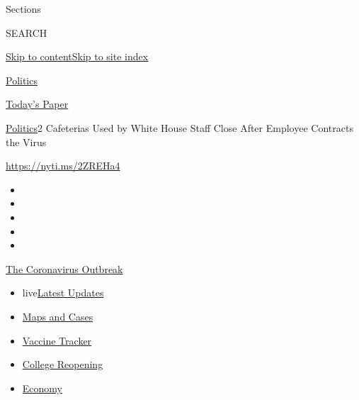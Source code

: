 Sections

SEARCH

\protect\hyperlink{site-content}{Skip to
content}\protect\hyperlink{site-index}{Skip to site index}

\href{https://www.nytimes3xbfgragh.onion/section/politics}{Politics}

\href{https://myaccount.nytimes3xbfgragh.onion/auth/login?response_type=cookie\&client_id=vi}{}

\href{https://www.nytimes3xbfgragh.onion/section/todayspaper}{Today's
Paper}

\href{/section/politics}{Politics}\textbar{}2 Cafeterias Used by White
House Staff Close After Employee Contracts the Virus

\url{https://nyti.ms/2ZREHa4}

\begin{itemize}
\item
\item
\item
\item
\item
\end{itemize}

\href{https://www.nytimes3xbfgragh.onion/news-event/coronavirus?action=click\&pgtype=Article\&state=default\&region=TOP_BANNER\&context=storylines_menu}{The
Coronavirus Outbreak}

\begin{itemize}
\tightlist
\item
  live\href{https://www.nytimes3xbfgragh.onion/2020/08/03/world/coronavirus-covid-19.html?action=click\&pgtype=Article\&state=default\&region=TOP_BANNER\&context=storylines_menu}{Latest
  Updates}
\item
  \href{https://www.nytimes3xbfgragh.onion/interactive/2020/us/coronavirus-us-cases.html?action=click\&pgtype=Article\&state=default\&region=TOP_BANNER\&context=storylines_menu}{Maps
  and Cases}
\item
  \href{https://www.nytimes3xbfgragh.onion/interactive/2020/science/coronavirus-vaccine-tracker.html?action=click\&pgtype=Article\&state=default\&region=TOP_BANNER\&context=storylines_menu}{Vaccine
  Tracker}
\item
  \href{https://www.nytimes3xbfgragh.onion/2020/08/02/us/covid-college-reopening.html?action=click\&pgtype=Article\&state=default\&region=TOP_BANNER\&context=storylines_menu}{College
  Reopening}
\item
  \href{https://www.nytimes3xbfgragh.onion/live/2020/08/03/business/stock-market-today-coronavirus?action=click\&pgtype=Article\&state=default\&region=TOP_BANNER\&context=storylines_menu}{Economy}
\end{itemize}

